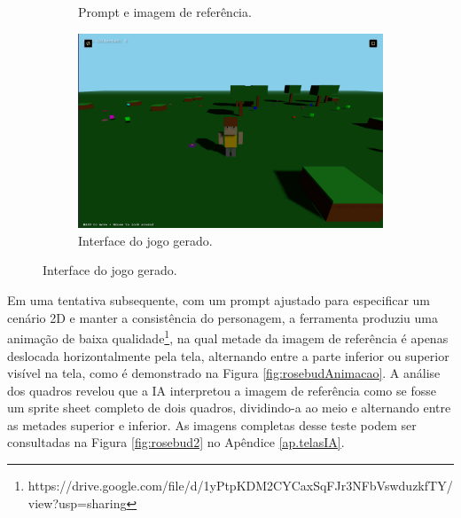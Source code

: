 \begin{figure}[htbp]
\begin{subfigure}{0.3\linewidth}
        \caption{\small Prompt e imagem de referência.}
        \label{fig:rosebudJogoPrompt}
    \end{subfigure} \hfill
        \begin{subfigure}{0.65\linewidth}
        \centering
        \includegraphics[width=1\linewidth]{figs/rosebud/principal2.PNG}
        \caption{\small Interface do jogo gerado.}
        \label{fig:rosebudJogoJogo}
    \end{subfigure}

\end{figure}


Em uma tentativa subsequente, com um prompt ajustado para especificar um cenário 2D e manter a consistência do personagem, a ferramenta produziu uma animação de baixa qualidade\footnote{https://drive.google.com/file/d/1yPtpKDM2CYCaxSqFJr3NFbVswduzkfTY/view?usp=sharing}, na qual metade da imagem de referência é apenas deslocada horizontalmente pela tela, alternando entre a parte inferior ou superior visível na tela, como é demonstrado na Figura \ref{fig:rosebudAnimacao}. A análise dos quadros revelou que  a IA interpretou a imagem de referência como se fosse um sprite sheet completo de dois quadros, dividindo-a ao meio e alternando entre as metades superior e inferior. As imagens completas desse teste podem ser consultadas na Figura \ref{fig:rosebud2} no Apêndice \ref{ap.telasIA}.

